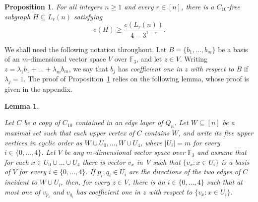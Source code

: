 \documentclass[11pt]{article}
\theoremstyle{plain}
\newtheorem{lemma}[theorem]{Lemma}
\newtheorem{proposition}[theorem]{Proposition}
\theoremstyle{definition}
\begin{document}
\begin{proposition}\label{proposition: layer_lower}
For all integers $n \geq 1$ and every $r \in [n]$, there is a $C_{10}$-free subgraph $H \subseteq L_r(n)$ satisfying
\[
    e(H) \geq \frac{e(L_r(n))}{4-3^{1-r}}.
\]
\end{proposition}

We shall need the following notation throughout.
Let $B=\{b_1,\ldots,b_m\}$ be a basis of an $m$-dimensional vector
space $V$ over $\mathbb{F}_3$, and let $z\in V$.
Writing $z = \lambda_1b_1 + \ldots + \lambda_mb_m$, we say that $b_j$ has \emph{coefficient one in $z$ with respect to $B$} if $\lambda_j = 1$. 
The proof of Proposition~\ref{proposition: layer_lower} relies on the following lemma, whose proof is given in the appendix.

\begin{lemma}\label{lemma: coefficient}

Let $C$ be a copy of $C_{10}$ contained in an edge layer of $Q_n$. 
Let $W \subseteq[n]$ be a maximal set such that each upper vertex of $C$
contains $W$, and write its five upper vertices in cyclic order as
$W \cup U_0, \ldots, W \cup U_4$, where $|U_i| = m$ for every $i \in \{0,\ldots, 4\}$. 
Let $V$ be any $m$-dimensional vector space over $\mathbb{F}_3$ and assume that for each $x \in U_0 \cup \ldots \cup U_4$ there is vector $v_x$ in V such that $\{v_x: x \in U_i\}$ is a basis of $V$ for every
$i \in \{0,\ldots,4\}$. 
If $p_i,q_i \in U_i$ are the directions of the two edges of $C$ incident
to $W \cup U_i$, then, for every $z \in V$, there is an $i \in \{0, \ldots, 4\}$ such that at most one of $v_{p_{i}}$ and $v_{q_{i}}$ has  coefficient one in $z$ with respect to $\{v_x : x \in U_i\}$.

\end{lemma}
\end{document}
